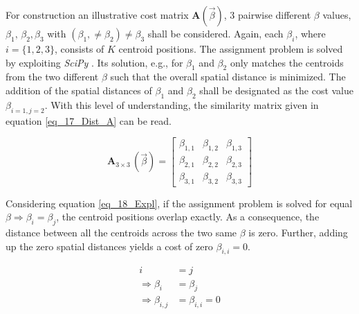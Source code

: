 For construction an illustrative cost matrix $\bm A(\vec{\beta})$, 
3 pairwise different $\beta$ values, $\beta_1, \, \beta_2, \beta_3$ with $(\beta_1,\neq \beta_2) \neq \beta_3$ shall be considered.
Again, each $\beta_i$, where $i = \{1,2,3\}$, consists of $K$ centroid positions.
The assignment problem is solved by exploiting \emph{SciPy} \cite{2020SciPy-NMeth}. 
Its solution, e.g., for $\beta_1$ and $\beta_2$ only matches the centroids from the two different $\beta$ such that the overall spatial distance is minimized. 
The addition of the spatial distances of $\beta_1$ and $\beta_2$ shall be designated as the cost value $\beta_{i=1,j=2}$.
With this level of understanding, the similarity matrix given in equation \eqref{eq_17_Dist_A} can be read.\newline

\begin{equation}
     \bm A_{3\times 3}\,(\vec{\beta}) = 
     \begin{bmatrix}
      \beta_{1,1} & \beta_{1,2} & \beta_{1,3}\\
       \beta_{2,1}  &\beta_{2,2} & \beta_{2,3}\\
       \beta_{3,1} & \beta_{3,2} &\beta_{3,3}
     \end{bmatrix}
     \label{eq_17_Dist_A}
   \end{equation}

Considering equation \eqref{eq_18_Expl}, if the assignment problem is solved for equal $\beta \Rightarrow \beta_i = \beta_j$, the centroid positions overlap exactly. 
As a consequence, the distance between all the centroids across the two same $\beta$ is zero. 
Further, adding up the zero spatial distances yields a cost of zero $\beta_{i,i} = 0$.\newline 

\begin{equation}
  \begin{aligned}
    i &= j \\ 
    \Rightarrow \beta_i &= \beta_j  \\
    \Rightarrow \beta_{i,j} &=  \beta_{i,i} = 0 
  \end{aligned}
    \label{eq_18_Expl}
\end{equation}


